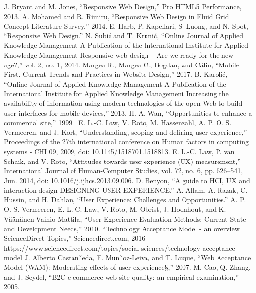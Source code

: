 \documentclass[article]{IEEEtran}
\begin{document}
\begin{thebibliography}{9}
                J. Bryant and M. Jones, “Responsive Web Design,” Pro HTML5 Performance, 2013.
                A. Mohamed and R. Rimiru, “Responsive Web Design in Fluid Grid Concept Literature Survey,” 2014.
                E. Harb, P. Kapellari, S. Luong, and N. Spot, “Responsive Web Design.”
                N. Subić and T. Krunić, “Online Journal of Applied Knowledge Management A Publication of the International Institute for Applied Knowledge Management Responsive web design – Are we ready for the new age?,” vol. 2, no. 1, 2014.
                Margea R., Margea C., Bogdan, and Călin, “Mobile First. Current Trends and Practices in Website Design,” 2017.
                B. Karolić, “Online Journal of Applied Knowledge Management A Publication of the International Institute for Applied Knowledge Management Increasing the availability of information using modern technologies of the open Web to build user interfaces for mobile devices,” 2013.
                H. A. Wan, “Opportunities to enhance a commercial site,” 1999.
‌
                E. L.-C. Law, V. Roto, M. Hassenzahl, A. P. O. S. Vermeeren, and J. Kort, “Understanding, scoping and defining user experience,” Proceedings of the 27th international conference on Human factors in computing systems - CHI 09, 2009, doi: 10.1145/1518701.1518813.
                E. L.-C. Law, P. van Schaik, and V. Roto, “Attitudes towards user experience (UX) measurement,” International Journal of Human-Computer Studies, vol. 72, no. 6, pp. 526–541, Jun. 2014, doi: 10.1016/j.ijhcs.2013.09.006.
                D. Benyon, “A guide to HCI, UX and interaction design DESIGNING USER EXPERIENCE.”
                A. Allam, A. Razak, C. Hussin, and H. Dahlan, “User Experience: Challenges and Opportunities.”
                A. P. O. S. Vermeeren, E. L.-C. Law, V. Roto, M. Obrist, J. Hoonhout, and K. Väänänen-Vainio-Mattila, “User Experience Evaluation Methods: Current State and Development Needs,” 2010.
                “Technology Acceptance Model - an overview | ScienceDirect Topics,” Sciencedirect.com, 2016. https://www.sciencedirect.com/topics/social-sciences/technology-acceptance-model
                J. Alberto Castan˜eda, F. Mun˜oz-Leiva, and T. Luque, “Web Acceptance Model (WAM): Moderating effects of user experience§,” 2007.
                M. Cao, Q. Zhang, and J. Seydel, “B2C e-commerce web site quality: an empirical examination,” 2005.


\end{thebibliography}
\end{document}
